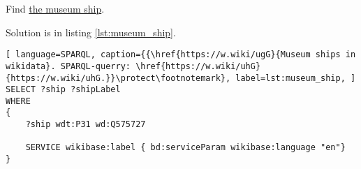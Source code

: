 \begin{exercise}
	\label{answer:ship_ex_3}
	Find \href{https://en.wikipedia.org/wiki/List_of_museum_ships}{the museum ship}.
\end{exercise}

Solution is in listing \ref{lst:museum_ship}.

\begin{lstlisting}[ language=SPARQL, caption={{\href{https://w.wiki/ugG}{Museum ships in wikidata}. SPARQL-querry: \href{https://w.wiki/uhG}{https://w.wiki/uhG.}}\protect\footnotemark}, label=lst:museum_ship, ]
SELECT ?ship ?shipLabel
WHERE
{
	?ship wdt:P31 wd:Q575727
			   
	SERVICE wikibase:label { bd:serviceParam wikibase:language "en"}
}
\end{lstlisting}
		
